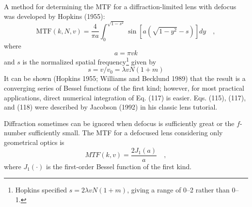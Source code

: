 \documentclass[11pt, oneside]{scrartcl}   	%
\begin{document}
A method for determining the MTF for a diffraction-limited lens with defocus was developed by Hopkins (1955):
\begin{equation}
   \mathrm{MTF}(k,N,v) = \frac4{\pi a}\int_0^{\sqrt{1-s^2}}\sin \left[a\left(\sqrt{1-y^2} - s \right) \right] dy \quad,
   \label{eq:MTF}
\end{equation}
where
\begin{equation}
 a = πv k
\end{equation}
and $s$ is the normalized spatial frequency\footnote{Hopkins specified $s = 2λvN(1 + m)$, giving a range of 0--2 rather than 0--1.} given by
\begin{equation}
s = v/v_0 = λvN(1+m)
\end{equation}
It can be shown (Hopkins 1955; Williams and Becklund 1989) that the result is a converging series of Bessel functions of the first kind; however, for most practical applications, direct numerical integration of Eq. (117) is easier. Eqs. (115), (117), and (118) were described by Jacobson (1992) in his classic lens tutorial.

Diffraction sometimes can be ignored when defocus is sufficiently great or the $f$-number sufficiently small. The MTF for a defocused lens considering only geometrical optics is
\begin{equation}
   MTF(k,v)= \frac{2J_1(a)}a\quad,
\end{equation}
where $J_1(\cdot)$ is the first-order Bessel function of the first kind.
\end{document}
